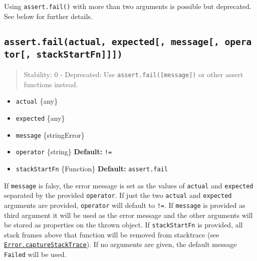 Using \texttt{assert.fail()} with more than two arguments is possible
but deprecated. See below for further details.

\subsection{\texorpdfstring{\texttt{assert.fail(actual,\ expected{[},\ message{[},\ operator{[},\ stackStartFn{]}{]}{]})}}{assert.fail(actual, expected{[}, message{[}, operator{[}, stackStartFn{]}{]}{]})}}\label{assert.failactual-expected-message-operator-stackstartfn}

\begin{quote}
Stability: 0 - Deprecated: Use \texttt{assert.fail({[}message{]})} or
other assert functions instead.
\end{quote}

\begin{itemize}
\tightlist
\item
  \texttt{actual} \{any\}
\item
  \texttt{expected} \{any\}
\item
  \texttt{message} \{string\textbar Error\}
\item
  \texttt{operator} \{string\} \textbf{Default:}
  \texttt{\textquotesingle{}!=\textquotesingle{}}
\item
  \texttt{stackStartFn} \{Function\} \textbf{Default:}
  \texttt{assert.fail}
\end{itemize}

If \texttt{message} is falsy, the error message is set as the values of
\texttt{actual} and \texttt{expected} separated by the provided
\texttt{operator}. If just the two \texttt{actual} and \texttt{expected}
arguments are provided, \texttt{operator} will default to
\texttt{\textquotesingle{}!=\textquotesingle{}}. If \texttt{message} is
provided as third argument it will be used as the error message and the
other arguments will be stored as properties on the thrown object. If
\texttt{stackStartFn} is provided, all stack frames above that function
will be removed from stacktrace (see
\href{errors.md\#errorcapturestacktracetargetobject-constructoropt}{\texttt{Error.captureStackTrace}}).
If no arguments are given, the default message \texttt{Failed} will be
used.

